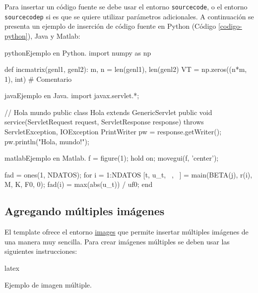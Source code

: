 	Para insertar un código fuente se debe usar el entorno \texttt{sourcecode}, o el entorno \texttt{sourcecodep} si es que se quiere utilizar parámetros adicionales. A continuación se presenta un ejemplo de inserción de código fuente en Python (Código \ref{codigo-python}), Java y Matlab:

\begin{sourcecode}[\label{codigo-python}]{python}{Ejemplo en Python.}
import numpy as np

def incmatrix(genl1, genl2):
	m, n = len(genl1), len(genl2)
	VT = np.zeros((n*m, 1), int) # Comentario
\end{sourcecode}

\begin{sourcecode}[]{java}{Ejemplo en Java.}
import javax.servlet.*;

// Hola mundo
public class Hola extends GenericServlet {
	public void service(ServletRequest request, ServletResponse response)
	throws ServletException, IOException{
		PrintWriter pw = response.getWriter();
		pw.println("Hola, mundo!");
	}
}
\end{sourcecode}

\begin{sourcecode}{matlab}{Ejemplo en Matlab.}
f = figure(1); hold on; movegui(f, 'center');

fad = ones(1, NDATOS); %
for i = 1:NDATOS
	[t, u_t, ~, ~] = main(BETA(j), r(i), M, K, F0, 0);
	fad(i) = max(abs(u_t)) / uf0;
end
\end{sourcecode}

\subsection{Agregando múltiples imágenes}

	El template ofrece el entorno \href{https://latex.ppizarror.com/informe#hlp-images}{images} que permite insertar múltiples imágenes de una manera muy sencilla. Para crear imágenes múltiples se deben usar las siguientes instrucciones:

\begin{sourcecode}{latex}{}
\begin{images}[\label{imagenmultiple}]{Ejemplo de imagen múltiple.}
	\imagesnewline
\end{images}
\end{sourcecode}

